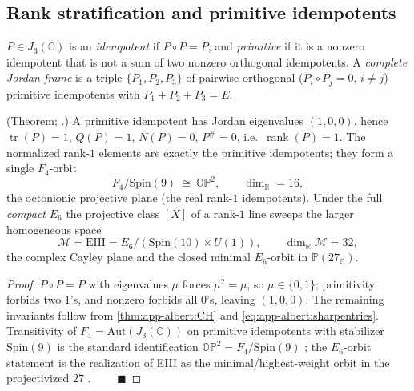 \subsection{Rank stratification and primitive idempotents}
\label{sec:app-albert:idempotents}

\begin{definition}\label{def:app-albert:idemp}
$P\in J_3(\mathbb O)$ is an \emph{idempotent} if $P\circ P=P$, and
\emph{primitive} if it is a nonzero idempotent that is not a sum of two nonzero
orthogonal idempotents. A \emph{complete Jordan frame} is a triple
$\{P_1,P_2,P_3\}$ of pairwise orthogonal ($P_i\circ P_j=0$, $i\neq j$) primitive
idempotents with $P_1+P_2+P_3=E$.
\end{definition}

\begin{theorem}\label{thm:app-albert:idemp}
\textup{(Theorem; \cite{McCrimmon:2004,Yokota:2009}.)}
A primitive idempotent has Jordan eigenvalues $(1,0,0)$, hence
$\operatorname{tr}(P)=1$, $Q(P)=1$, $N(P)=0$, $P^\#=0$, i.e.\
$\operatorname{rank}(P)=1$. The normalized rank-$1$ elements are exactly the
primitive idempotents; they form a single $F_4$-orbit
\begin{equation}\label{eq:app-albert:OP2}
  F_4/\mathrm{Spin}(9)\ \cong\ \mathbb{OP}^2,
  \qquad \dim_{\mathbb R}=16,
\end{equation}
the octonionic projective plane (the real rank-$1$ idempotents). Under the full
\emph{compact} $E_6$ the projective class $[X]$ of a rank-$1$ line sweeps the
larger homogeneous space
\begin{equation}\label{eq:app-albert:EIII}
  \mathcal M=\mathrm{EIII}=E_6/(\mathrm{Spin}(10)\times U(1)),
  \qquad \dim_{\mathbb R}\mathcal M=32,
\end{equation}
the complex Cayley plane and the closed minimal $E_6$-orbit in
$\mathbb P(27_{\mathbb C})$.
\end{theorem}

\begin{proof}
$P\circ P=P$ with eigenvalues $\mu$ forces $\mu^2=\mu$, so $\mu\in\{0,1\}$;
primitivity forbids two $1$'s, and nonzero forbids all $0$'s, leaving $(1,0,0)$.
The remaining invariants follow from \autoref{thm:app-albert:CH} and
\eqref{eq:app-albert:sharpentries}. Transitivity of $F_4=\mathrm{Aut}(J_3(\mathbb
O))$ on primitive idempotents with stabilizer $\mathrm{Spin}(9)$ is the standard
identification $\mathbb{OP}^2=F_4/\mathrm{Spin}(9)$
\cite{Baez:2002,Yokota:2009}; the $E_6$-orbit statement is the realization of
EIII as the minimal/highest-weight orbit in the projectivized $27$
\cite{Springer:2000}. $\qquad\blacksquare$
\end{proof}

